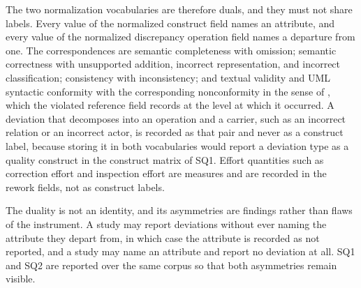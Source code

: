 The two normalization vocabularies are therefore duals, and they must not share labels. Every value of the normalized construct field names an attribute, and every value of the normalized discrepancy operation field names a departure from one. The correspondences are semantic completeness with omission; semantic correctness with unsupported addition, incorrect representation, and incorrect classification; consistency with inconsistency; and textual validity and UML syntactic conformity with the corresponding nonconformity in the sense of \cite{ISO9000}, which the violated reference field records at the level at which it occurred. A deviation that decomposes into an operation and a carrier, such as an incorrect relation or an incorrect actor, is recorded as that pair and never as a construct label, because storing it in both vocabularies would report a deviation type as a quality construct in the construct matrix of SQ1. Effort quantities such as correction effort and inspection effort are measures and are recorded in the rework fields, not as construct labels.

The duality is not an identity, and its asymmetries are findings rather than flaws of the instrument. A study may report deviations without ever naming the attribute they depart from, in which case the attribute is recorded as not reported, and a study may name an attribute and report no deviation at all. SQ1 and SQ2 are reported over the same corpus so that both asymmetries remain visible.

